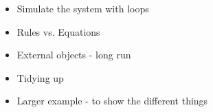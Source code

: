 \documentclass[runningheads]{llncs}
\begin{document}
\begin{itemize}
  \item Simulate the system with loops
  \item Rules vs. Equations
  \item External objects - long run
  \item Tidying up
  \item Larger example - to show the different things
\end{itemize}

%

%

%

%

%

%

%
%




\end{document}
